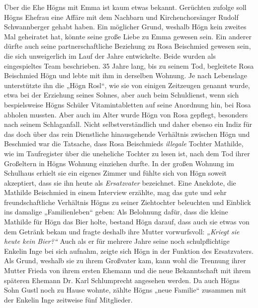 \documentclass{book}
\newcommand{\zitat}[1]{\textit{#1}}
\begin{document}
Über die Ehe Högns mit Emma ist kaum etwas bekannt. Gerüchten zufolge
soll Högns Ehefrau eine Affäre mit dem Nachbarn und Kirchenchorsänger
Rudolf Schwannberger gehabt haben. Ein möglicher Grund, weshalb Högn
kein zweites Mal geheiratet hat, könnte seine große Liebe zu Emma
gewesen sein. Ein anderer dürfte auch seine partnerschaftliche
Beziehung zu Rosa Beischmied gewesen sein, die sich unweigerlich im
Lauf der Jahre entwickelte. Beide wurden als eingespieltes Team
beschrieben. 35 Jahre lang, bis zu seinem Tod, begleitete Rosa
Beischmied Högn und lebte mit ihm in derselben Wohnung. Je nach
Lebenslage unterstützte ihn die „Högn Rosl“, wie sie von einigen
Zeitzeugen genannt wurde, etwa bei der Erziehung seines Sohnes, aber
auch beim Schuldienst, wenn sich bespielsweise Högns Schüler
Vitamintabletten auf seine Anordnung hin, bei Rosa abholen mussten.
Aber auch im Alter wurde Högn von Rosa gepflegt, besonders nach seinem
Schlaganfall. Nicht selbstverständlich und daher ebenso ein Indiz für
das doch über das rein Dienstliche hinausgehende Verhältnis zwischen
Högn und Beschmied war die Tatsache, dass Rosa Beischmieds
\textit{illegale} Tochter Mathilde, wie im Taufregister über die
uneheliche Tochter zu lesen ist, nach dem Tod ihrer Großeltern in Högns
Wohnung einziehen durfte. In der großen Wohnung im Schulhaus erhielt
sie ein eigenes Zimmer und fühlte sich von Högn soweit akzeptiert, dass
sie ihn heute als \textit{Ersatzvater} bezeichnet. Eine Anekdote, die
Mathilde Beischmied in einem Interview erzählte, mag das gute und sehr
freundschaftliche Verhältnis Högns zu seiner Ziehtochter beleuchten und
Einblick ins damalige „Familienleben“ geben: Als Belohnung dafür, dass
die kleine Mathilde für Högn das Bier holte, bestand Högn darauf, dass
auch sie etwas von dem Getränk bekam und fragte deshalb ihre Mutter
vorwurfsvoll: \zitat{\textup{„Kriegt sie heute kein Bier?“}
}Auch als er für mehrere Jahre seine noch schulpflichtige Enkelin
Inge bei sich aufnahm, zeigte sich Högn in der Funktion des
Ersatzvaters. Als Grund, weshalb sie zu ihrem Großvater kam, kann wohl
die Trennung ihrer Mutter Frieda von ihrem ersten Ehemann und die neue
Bekanntschaft mit ihrem späteren Ehemann Dr. Karl Schlumprecht
angesehen werden. Da auch Högns Sohn Gustl noch zu Hause wohnte, zählte
Högns „neue Familie“ zusammen mit der Enkelin Inge zeitweise fünf
Mitglieder.
\end{document}
